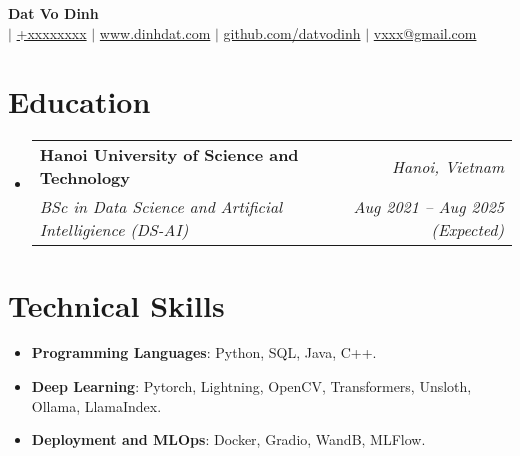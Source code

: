 \documentclass[letterpaper,11pt]{article}
\makeatletter
\newcommand{\resumeitem}[1]{
  \item\small{
    #1 \vspace{-2pt}
  }
}
\newcommand{\resumeSubheading}[4]{
  \vspace{-1pt}\item
    \begin{tabular*}{0.97\textwidth}[t]{l@{\extracolsep{\fill}}r}
      \textbf{#1} & \textit{#2} \\
      \textit{\small#3} & \textit{\small #4} \\
    \end{tabular*}\vspace{-6pt}
}
\newcommand{\resumeSubHeadingListStart}{\begin{itemize}[leftmargin=*,label={}]}
\newcommand{\resumeSubHeadingListEnd}{\end{itemize}}
\newcommand{\resumeItemListStart}{\begin{itemize}}
\newcommand{\resumeItemListEnd}{\end{itemize}\vspace{-5pt}}
\makeatother
\begin{document}

\begin{center}
  \textbf{\huge {Dat Vo Dinh}} \\ \vspace{4pt}
   $|$ \href{tel:+xxxxxxxx}{{+xxxxxxxx}} $|$ \href{https://dinhdat.com}{{www.dinhdat.com}}
  $|$ \href{https://github.com/datvodinh/}{{github.com/datvodinh}} $|$ \href{mailto:vxxx@gmail.com}{{vxxx@gmail.com}}
\end{center}

\section{Education}
  \resumeSubHeadingListStart
    \resumeSubheading
      {Hanoi University of Science and Technology}{\textit{Hanoi, Vietnam}}
      {BSc in Data Science and Artificial Intelligience (DS-AI)}{Aug 2021 -- Aug 2025 (Expected)}
  \resumeSubHeadingListEnd

  
\section{Technical Skills}
\resumeItemListStart[leftmargin=6pt,label={}]
  \resumeitem{\textbf{Programming Languages}: {Python, SQL, Java, C++.}} \\[-\baselineskip]
  \resumeitem{\textbf{Deep Learning}: {Pytorch, Lightning, OpenCV, Transformers, Unsloth, Ollama, LlamaIndex.}} \\[-\baselineskip]
  \resumeitem{\textbf{Deployment and MLOps}: {Docker, Gradio, WandB, MLFlow.}} \\[-\baselineskip]
\resumeItemListEnd
\end{document}
